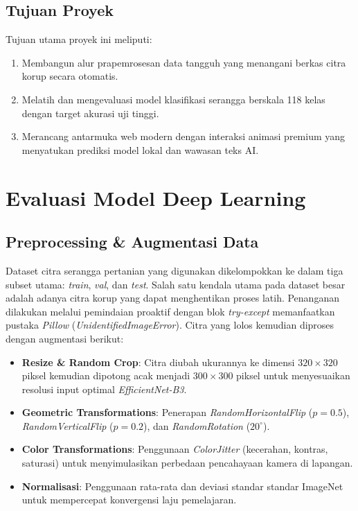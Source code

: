 \documentclass[12pt, a4paper]{article}
\begin{document}
\subsection{Tujuan Proyek}
Tujuan utama proyek ini meliputi:
\begin{enumerate}
    \item Membangun alur prapemrosesan data tangguh yang menangani berkas citra korup secara otomatis.
    \item Melatih dan mengevaluasi model klasifikasi serangga berskala 118 kelas dengan target akurasi uji tinggi.
    \item Merancang antarmuka web modern dengan interaksi animasi premium yang menyatukan prediksi model lokal dan wawasan teks AI.
\end{enumerate}

\newpage
\section{Evaluasi Model Deep Learning}

\subsection{Preprocessing & Augmentasi Data}
Dataset citra serangga pertanian yang digunakan dikelompokkan ke dalam tiga subset utama: \textit{train}, \textit{val}, dan \textit{test}. Salah satu kendala utama pada dataset besar adalah adanya citra korup yang dapat menghentikan proses latih. Penanganan dilakukan melalui pemindaian proaktif dengan blok \textit{try-except} memanfaatkan pustaka \textit{Pillow} (\textit{UnidentifiedImageError}). Citra yang lolos kemudian diproses dengan augmentasi berikut:
\begin{itemize}
    \item \textbf{Resize & Random Crop}: Citra diubah ukurannya ke dimensi $320 \times 320$ piksel kemudian dipotong acak menjadi $300 \times 300$ piksel untuk menyesuaikan resolusi input optimal \textit{EfficientNet-B3}.
    \item \textbf{Geometric Transformations}: Penerapan \textit{RandomHorizontalFlip} ($p=0.5$), \textit{RandomVerticalFlip} ($p=0.2$), dan \textit{RandomRotation} ($20^\circ$).
    \item \textbf{Color Transformations}: Penggunaan \textit{ColorJitter} (kecerahan, kontras, saturasi) untuk menyimulasikan perbedaan pencahayaan kamera di lapangan.
    \item \textbf{Normalisasi}: Penggunaan rata-rata dan deviasi standar standar ImageNet untuk mempercepat konvergensi laju pemelajaran.
\end{itemize}
\end{document}
